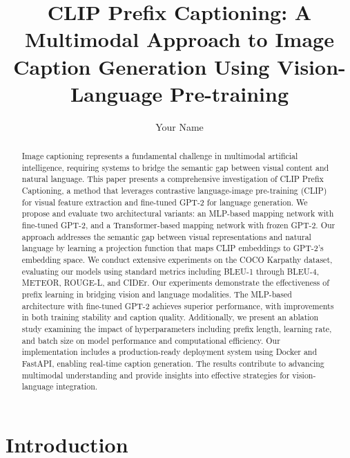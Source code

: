\documentclass[runningheads]{llncs}
\begin{document}
%
\title{CLIP Prefix Captioning: A Multimodal Approach to Image Caption Generation Using Vision-Language Pre-training}
%
%
\author{Your Name}
%
%
%
\maketitle              %
%
\begin{abstract}
Image captioning represents a fundamental challenge in multimodal artificial intelligence, requiring systems to bridge the semantic gap between visual content and natural language. This paper presents a comprehensive investigation of CLIP Prefix Captioning, a method that leverages contrastive language-image pre-training (CLIP) for visual feature extraction and fine-tuned GPT-2 for language generation. We propose and evaluate two architectural variants: an MLP-based mapping network with fine-tuned GPT-2, and a Transformer-based mapping network with frozen GPT-2. Our approach addresses the semantic gap between visual representations and natural language by learning a projection function that maps CLIP embeddings to GPT-2's embedding space. We conduct extensive experiments on the COCO Karpathy dataset, evaluating our models using standard metrics including BLEU-1 through BLEU-4, METEOR, ROUGE-L, and CIDEr. Our experiments demonstrate the effectiveness of prefix learning in bridging vision and language modalities. The MLP-based architecture with fine-tuned GPT-2 achieves superior performance, with improvements in both training stability and caption quality. Additionally, we present an ablation study examining the impact of hyperparameters including prefix length, learning rate, and batch size on model performance and computational efficiency. Our implementation includes a production-ready deployment system using Docker and FastAPI, enabling real-time caption generation. The results contribute to advancing multimodal understanding and provide insights into effective strategies for vision-language integration.

\end{abstract}
%
%
%
\section{Introduction}
\end{document}
